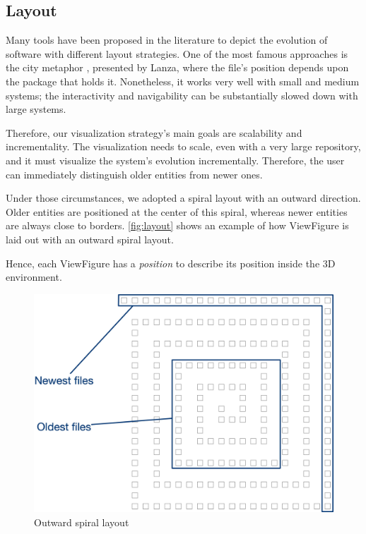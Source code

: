 \subsection*{Layout}
Many tools have been proposed in the literature to depict the evolution of software with different layout strategies. 
One of the most famous approaches is the city metaphor \cite{Wettel2007}, presented by Lanza, where the file's position depends upon the package that holds it. 
Nonetheless, it works very well with small and medium systems; the interactivity and navigability can be substantially slowed down with large systems.

Therefore, our visualization strategy's main goals are scalability and incrementality. The visualization needs to scale, even with a very large repository, and it must visualize the system's evolution incrementally. Therefore, the user can immediately distinguish older entities from newer ones.

Under those circumstances, we adopted a spiral layout with an outward direction. Older entities are positioned at the center of this spiral, whereas newer entities are always close to borders. 
\autoref{fig:layout} shows an example of how ViewFigure is laid out with an outward spiral layout.

Hence, each ViewFigure has a \textit{position} to describe its position inside the 3D environment. 

\begin{figure}
    \center
    \includegraphics[width=\textwidth]{SpiralLayout.jpg}
    \caption{Outward spiral layout}
    \label{fig:layout}
\end{figure}

